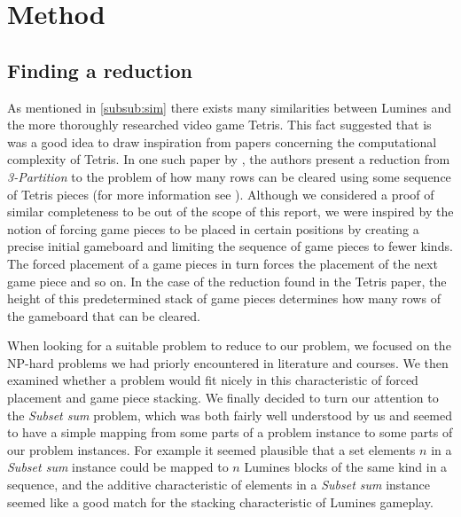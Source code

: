 \section{Method}
\subsection{Finding a reduction}
As mentioned in \ref{subsub:sim} there exists many similarities between Lumines and the more thoroughly researched video game Tetris. This fact suggested that is was a good idea to draw inspiration from papers concerning the computational complexity of Tetris. In one such paper by \citeauthor{tetris}, the authors present a reduction from \textit{3-Partition} to the problem of how many rows can be cleared using some sequence of Tetris pieces (for more information see \cite{tetris}). Although we considered a proof of similar completeness to be out of the scope of this report, we were inspired by the notion of forcing game pieces to be placed in certain positions by creating a precise initial gameboard and limiting the sequence of game pieces to fewer kinds. The forced placement of a game pieces in turn forces the placement of the next game piece and so on. In the case of the reduction found in the Tetris paper, the height of this predetermined stack of game pieces determines how many rows of the gameboard that can be cleared.

When looking for a suitable problem to reduce to our problem, we focused on the NP-hard problems we had priorly encountered in literature and courses. We then examined whether a problem would fit nicely in this characteristic of forced placement and game piece stacking. We finally decided to turn our attention to the \textit{Subset sum} problem, which was both fairly well understood by us and seemed to have a simple mapping from some parts of a problem instance to some parts of our problem instances. For example it seemed plausible that a set elements $n$ in a \textit{Subset sum} instance could be mapped to $n$ Lumines blocks of the same kind in a sequence, and the additive characteristic of elements in a \textit{Subset sum} instance seemed like a good match for the stacking characteristic of Lumines gameplay.